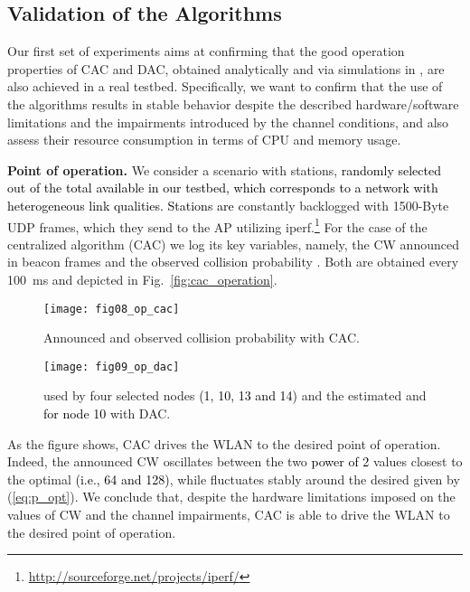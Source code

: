 \documentclass[a4paper,10pt]{article}
\newcommand{\revs}[1]{\textcolor{black}{#1}}
\begin{document}
\subsection{Validation of the Algorithms}

Our first set of experiments aims at confirming that the good operation properties of CAC and DAC, obtained analytically and via simulations in \cite{patras09monet,patras10tmc}, are also achieved in a real testbed. Specifically, we want to confirm that the use of the algorithms results in stable behavior despite the described hardware/software limitations and the impairments introduced by the channel conditions, and also assess their resource consumption in terms of CPU and memory usage.

\vspace{0.25em}
{\bf Point of operation.} We consider a scenario with  stations, \revs{randomly selected out of the total available in our testbed, which corresponds to a network with heterogeneous link qualities. Stations are} constantly backlogged with 1500-Byte UDP frames, which they send to the AP utilizing {\ttfamily iperf}.\footnote{{\ttfamily \url{http://sourceforge.net/projects/iperf/}}} For the case of the centralized algorithm (CAC) we log its key variables, namely, the {\ttfamily CW} announced in beacon frames and the observed collision probability . Both are obtained every 100~ms and depicted in Fig.~\ref{fig:cac_operation}. 


\begin{figure}[t!]
\hspace{-0.3cm}
\begin{minipage}[b]{0.5\linewidth}
\centering
\texttt{[image: fig08\_op\_cac]}\caption{Announced  and observed collision probability with CAC.}\vspace{1.5em}
\label{fig:cac_operation}\end{minipage}
\hspace{0.5cm}
\begin{minipage}[b]{0.5\linewidth}
\centering
\texttt{[image: fig09\_op\_dac]}\caption{ used by four selected nodes \revs{(1, 10, 13 and 14)} and the estimated  and  \revs{for node 10} with DAC.}\label{fig:dac_operation}\end{minipage}
\end{figure}

As the figure shows, CAC drives the WLAN to the desired point of operation. Indeed, the announced {\ttfamily CW} oscillates between the two \revs{power of 2} values closest to the optimal  \revs{(i.e., 64 and 128)}, while  fluctuates stably around the desired  given by (\ref{eq:p_opt}). We conclude that, despite the hardware limitations imposed on the values of {\ttfamily CW} and the channel impairments, CAC is able to drive the WLAN to the desired point of operation. 
\end{document}
